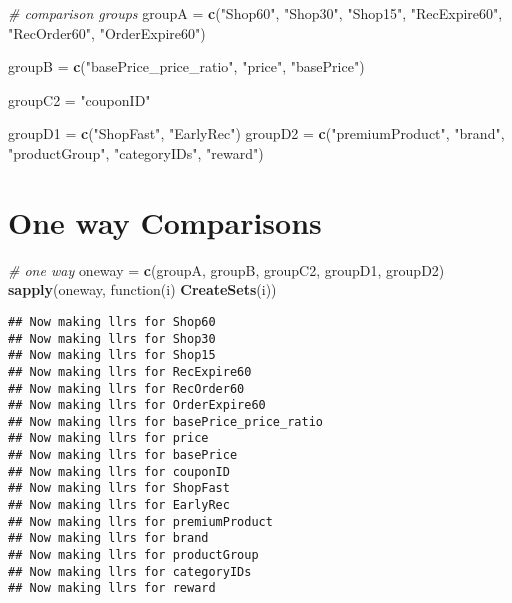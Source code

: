 \documentclass[10pt]{report}
\newenvironment{Shaded}{}{}
\newcommand{\KeywordTok}[1]{\textcolor[rgb]{0.00,0.44,0.13}{\textbf{{#1}}}}
\newcommand{\StringTok}[1]{\textcolor[rgb]{0.25,0.44,0.63}{{#1}}}
\newcommand{\CommentTok}[1]{\textcolor[rgb]{0.38,0.63,0.69}{\textit{{#1}}}}
\newcommand{\NormalTok}[1]{{#1}}
\begin{document}
\begin{Shaded}
\begin{Highlighting}[]
\CommentTok{# comparison groups}
\NormalTok{groupA =}\StringTok{ }\KeywordTok{c}\NormalTok{(}\StringTok{"Shop60"}\NormalTok{, }\StringTok{"Shop30"}\NormalTok{, }\StringTok{"Shop15"}\NormalTok{, }\StringTok{"RecExpire60"}\NormalTok{, }\StringTok{"RecOrder60"}\NormalTok{, }\StringTok{"OrderExpire60"}\NormalTok{)}

\NormalTok{groupB =}\StringTok{ }\KeywordTok{c}\NormalTok{(}\StringTok{"basePrice_price_ratio"}\NormalTok{, }\StringTok{"price"}\NormalTok{, }\StringTok{"basePrice"}\NormalTok{)}

\NormalTok{groupC2 =}\StringTok{ "couponID"}

\NormalTok{groupD1 =}\StringTok{ }\KeywordTok{c}\NormalTok{(}\StringTok{"ShopFast"}\NormalTok{, }\StringTok{"EarlyRec"}\NormalTok{)}
\NormalTok{groupD2 =}\StringTok{ }\KeywordTok{c}\NormalTok{(}\StringTok{"premiumProduct"}\NormalTok{, }\StringTok{"brand"}\NormalTok{, }\StringTok{"productGroup"}\NormalTok{, }\StringTok{"categoryIDs"}\NormalTok{, }\StringTok{"reward"}\NormalTok{)}
\end{Highlighting}
\end{Shaded}

\section{One way Comparisons}\label{one-way-comparisons}

\begin{Shaded}
\begin{Highlighting}[]
\CommentTok{# one way}
\NormalTok{oneway =}\StringTok{ }\KeywordTok{c}\NormalTok{(groupA, groupB, groupC2, groupD1, groupD2)}
\KeywordTok{sapply}\NormalTok{(oneway, function(i) }\KeywordTok{CreateSets}\NormalTok{(i))}
\end{Highlighting}
\end{Shaded}

\begin{verbatim}
## Now making llrs for Shop60
## Now making llrs for Shop30
## Now making llrs for Shop15
## Now making llrs for RecExpire60
## Now making llrs for RecOrder60
## Now making llrs for OrderExpire60
## Now making llrs for basePrice_price_ratio
## Now making llrs for price
## Now making llrs for basePrice
## Now making llrs for couponID
## Now making llrs for ShopFast
## Now making llrs for EarlyRec
## Now making llrs for premiumProduct
## Now making llrs for brand
## Now making llrs for productGroup
## Now making llrs for categoryIDs
## Now making llrs for reward
\end{verbatim}
\end{document}
